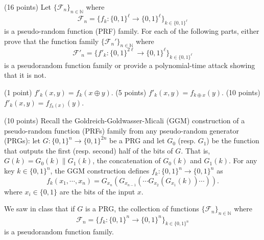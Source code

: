 \documentclass{article}
\newcommand{\secp}{n}
\begin{document}
\begin{problems}

 (16 points) Let $\{\mathcal{F}_\secp\}_{\secp \in \mathbb{N}}$ where $$\mathcal{F}_n = \{ f_k: \{0,1\}^\ell \to \{0,1\}^\ell\}_{k \in \{0,1\}^{\ell}}$$ is a pseudo-random function (PRF) family. For each of the following parts, either prove that the function family
$\{\mathcal{F}_\secp'\}_{\secp \in \mathbb{N}}$ where 
$$\mathcal{F}'_n = \{ f'_k: \{0,1\}^{2\ell} \to \{0,1\}^\ell\}_{k \in \{0,1\}^{\ell}}$$ 
is a pseudorandom function family or provide a polynomial-time attack showing that it is not. 

\begin{problemparts}
\problempart (1 point) $f'_k(x,y) = f_k(x \oplus y)$.
\problempart (5 points) $f'_k(x,y) = f_{k\oplus x}(y)$.
\problempart (10 points) $f'_k(x,y) = f_{f_k(x)}(y)$.
\end{problemparts}



 (10 points) Recall the Goldreich-Goldwasser-Micali (GGM) construction of a pseudo-random function (PRFs) family from any pseudo-random generator (PRGs): let $G: \{0,1\}^{\secp} \to \{0,1\}^{2\secp}$ be a PRG and let $G_0$ (resp. $G_1$) be the function that outputs the first (resp. second) half of the bits of $G$. That is, $G(k)= G_0(k)\| G_1(k)$, the concatenation of $G_0(k)$ and $G_1(k)$. For any key $k \in \{0,1\}^\secp$, the GGM construction defines $f_k: \{0,1\}^\secp \to \{0,1\}^\secp$ as 
$$ f_k(x_1, \cdots, x_n) = G_{x_n}(G_{x_{n-1}}(\cdots G_{x_2}(G_{x_1}(k)) \cdots )).$$
where $x_i \in \{0,1\}$ are the bits of the input $x$.

We saw in class that if $G$ is a PRG, the collection of functions $\{\mathcal{F}_\secp\}_{\secp\in \mathbb{N}}$ where 
$$ \mathcal{F}_\secp = \{f_k: \{0,1\}^\secp \to \{0,1\}^{\secp}\}_{k\in \{0,1\}^\secp}$$
is a pseudorandom function family.



\end{problems}
\end{document}
